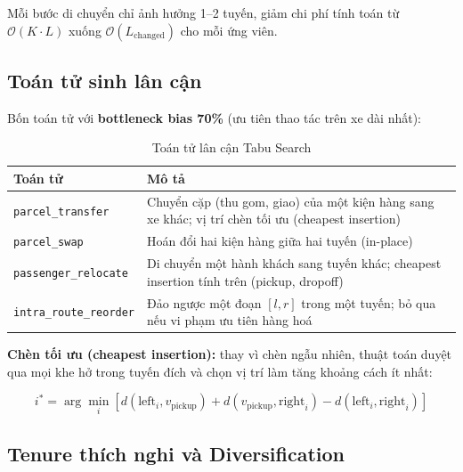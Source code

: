 \documentclass[12pt, a4paper]{article}
\begin{document}
Mỗi bước di chuyển chỉ ảnh hưởng 1--2 tuyến, giảm chi phí tính toán từ $\mathcal{O}(K\cdot L)$ xuống $\mathcal{O}(L_{\text{changed}})$ cho mỗi ứng viên.

\subsection{Toán tử sinh lân cận}

Bốn toán tử với \textbf{bottleneck bias 70\%} (ưu tiên thao tác trên xe dài nhất):

\begin{table}[H]
\centering
\caption{Toán tử lân cận Tabu Search}
\begin{tabular}{lp{9.5cm}}
\toprule
\textbf{Toán tử} & \textbf{Mô tả} \\
\midrule
\texttt{parcel\_transfer}   & Chuyển cặp (thu gom, giao) của một kiện hàng sang xe khác; vị trí chèn tối ưu (cheapest insertion) \\
\texttt{parcel\_swap}       & Hoán đổi hai kiện hàng giữa hai tuyến (in-place) \\
\texttt{passenger\_relocate}& Di chuyển một hành khách sang tuyến khác; cheapest insertion tính trên (pickup, dropoff) \\
\texttt{intra\_route\_reorder} & Đảo ngược một đoạn $[l, r]$ trong một tuyến; bỏ qua nếu vi phạm ưu tiên hàng hoá \\
\bottomrule
\end{tabular}
\end{table}

\textbf{Chèn tối ưu (cheapest insertion):} thay vì chèn ngẫu nhiên, thuật toán duyệt qua mọi khe hở trong tuyến đích và chọn vị trí làm tăng khoảng cách ít nhất:

\begin{equation}
  i^* = \arg\min_{i} \left[ d(\text{left}_i, v_{\text{pickup}}) + d(v_{\text{pickup}}, \text{right}_i) - d(\text{left}_i, \text{right}_i) \right]
\end{equation}

\subsection{Tenure thích nghi và Diversification}
\end{document}
